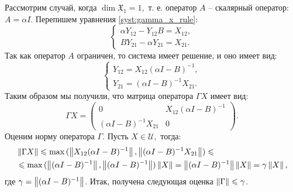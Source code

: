 Рассмотрим случай, когда $\dim\mathfrak{X}_1 = 1,$ т.\! е. оператор $A$ -- скалярный оператор: $A = \alpha I.$ Перепишем уравнения \ref{syst:gamma_x_rule}:
$$
	\begin{cases}
		\alpha Y_{12} - Y_{12}B = X_{12}, \\
		BY_{21} - \alpha Y_{21} = X_{21}.
	\end{cases}
$$
Так как оператор $A$ ограничен, то система имеет решение, и оно имеет вид:
$$
	\begin{cases}
		Y_{12} = X_{12}(\alpha I - B)^{-1}, \\
		Y_{21} = (\alpha I - B)^{-1}X_{21}.
	\end{cases}
$$
Таким образом мы получили, что матрица оператора $\Gamma X$ имеет вид:
$$
	\Gamma X = \begin{pmatrix}
		0 & X_{12}(\alpha I - B)^{-1} \\
		(\alpha I - B)^{-1}X_{21} & 0
	\end{pmatrix}.
$$
Оценим норму оператора $\Gamma.$ Пусть $X \in \mathcal{U},$ тогда:
\begin{align*}
&\left\|\Gamma X\right\| \leqslant \max{(\left\|X_{12}(\alpha I - B)^{-1}\right\|, \left\|(\alpha I - B)^{-1}X_{21}\right\|)} \leqslant \\ 
&\leqslant \max{(\left\|(\alpha I - B)^{-1}\right\|, \left\|(\alpha I - B)^{-1}\right\|)}\left\|X\right\| = \left\|(\alpha I - B)^{-1}\right\|\left\|X\right\| = \gamma \left\|X\right\|,
\end{align*}  
где $\gamma = \left\|(\alpha I - B)^{-1}\right\|$.
Итак, получена следующая оценка $\left\|\Gamma\right\| \leqslant \gamma$.
